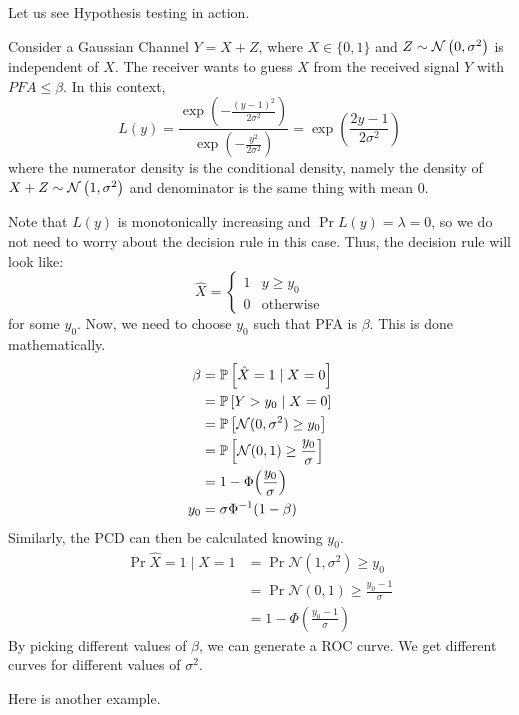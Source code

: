 Let us see Hypothesis testing in action.

\begin{example}
    Consider a Gaussian Channel $Y = X + Z$, where $X \in \{0, 1\}$ and $Z \sim \mathcal{N}\left( 0, \sigma^2 \right)$ is independent of $X$.
    The receiver wants to guess $X$ from the received signal $Y$ with $PFA \leq \beta$. In this context,
    \[ L(y) = \frac{\exp(-\frac{(y - 1)^2}{2 \sigma^2})}{\exp(-\frac{y^2}{2 \sigma^2})} = \exp(\frac{2y - 1}{2 \sigma^2})\]
    where the numerator density is the conditional density, namely the density of $X + Z \sim \mathcal{N}\left( 1, \sigma^2 \right)$ and denominator is the same thing with mean 0.

    Note that $L(y)$ is monotonically increasing and $\Pr{L(y) = \lambda} = 0$, so we do not need to worry about the decision rule in this case.
    Thus, the decision rule will look like:
    \[ \hat{X} = \begin{cases}
        1 & y \geq y_0 \\
        0 & \text{otherwise}
    \end{cases}\]
    for some $y_0$. Now, we need to choose $y_0$ such that PFA is $\beta$. This is done mathematically.
    \begin{align*}
        \beta &= \mathbb{P}\left[ \hat{X} = 1 \mid X = 0 \right] \\
        &= \mathbb{P}\left[ Y > y_0 \mid X = 0 \right] \\
        &= \mathbb{P}\left[ \mathcal{N}(0, \sigma^2) \geq y_0 \right] \\
        &= \mathbb{P}\left[ \mathcal{N}(0, 1) \geq \frac{y_0}{\sigma} \right] \\
        &= 1 - \Phi\qty(\frac{y_0}{\sigma}) \\
        y_0 &= \sigma \Phi^{-1}(1 - \beta)
    \end{align*}
    Similarly, the PCD can then be calculated knowing $y_0$.
    \begin{align*}
        \Pr{\hat{X} = 1 \mid X = 1} &= \Pr{\mathcal{N}(1, \sigma^2) \geq y_0} \\
        &= \Pr{\mathcal{N}(0, 1) \geq \frac{y_0 - 1}{\sigma}} \\
        &= 1 - \Phi(\frac{y_0 - 1}{\sigma})
    \end{align*}
    By picking different values of $\beta$, we can generate a ROC curve. We get different curves for different values of $\sigma^2$.
\end{example}

Here is another example.

